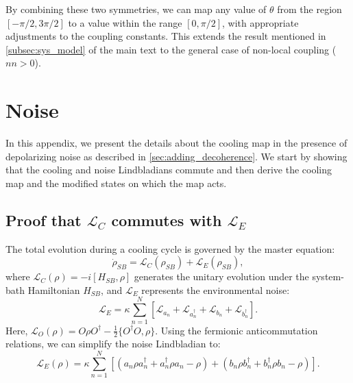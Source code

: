 By combining these two symmetries, we can map any value of $\theta$ from the region $[-\pi/2,3\pi/2]$ to a value within the range $[0,\pi/2]$, with appropriate adjustments to the coupling constants. This extends the result mentioned in \cref{subsec:sys_model} of the main text to the general case of non-local coupling ($nn > 0$).

\section{Noise}
\label{app:secIV_noise}

In this appendix, we present the details about the cooling map in the presence of depolarizing noise as described in \cref{sec:adding_decoherence}. We start by showing that the cooling and noise Lindbladians commute and then derive the cooling map and the modified states on which the map acts.

\subsection{Proof that \texorpdfstring{$\mathcal{L}_C$}{LC} commutes with \texorpdfstring{$\mathcal{L}_E$}{LE}}
\label{app:LcCommuteLe}


The total evolution during a cooling cycle is governed by the master equation:
\begin{equation}
    \dot \rho_{SB} = \mathcal{L}_C(\rho_{SB}) + \mathcal{L}_E(\rho_{SB}),
\end{equation}
where $\mathcal{L}_C(\rho) = -i [H_{SB},\rho]$ generates the unitary evolution under the system-bath Hamiltonian $H_{SB}$, and $\mathcal{L}_E$ represents the environmental noise:
\begin{equation}
    \mathcal{L}_E = \kappa\sum_{n=1}^N \left[\mathcal{L}_{a_n} + \mathcal{L}_{a_n^\dagger} + \mathcal{L}_{b_n} + \mathcal{L}_{b_n^\dagger}\right].
    \label{eq:app:LE_def}
\end{equation}
Here, $\mathcal{L}_O(\rho) = O\rho O^\dagger - \frac{1}{2}\{O^\dagger O,\rho\}$.
Using the fermionic anticommutation relations, we can simplify the noise Lindbladian to:
\begin{equation}
    \mathcal{L}_E(\rho) = \kappa\sum_{n=1}^N \left[ (a_n\rho a_n^\dagger + a_n^\dagger\rho a_n - \rho) + (b_n\rho b_n^\dagger + b_n^\dagger\rho b_n - \rho) \right].
    \label{eq:LE_explicit_app}
\end{equation}


